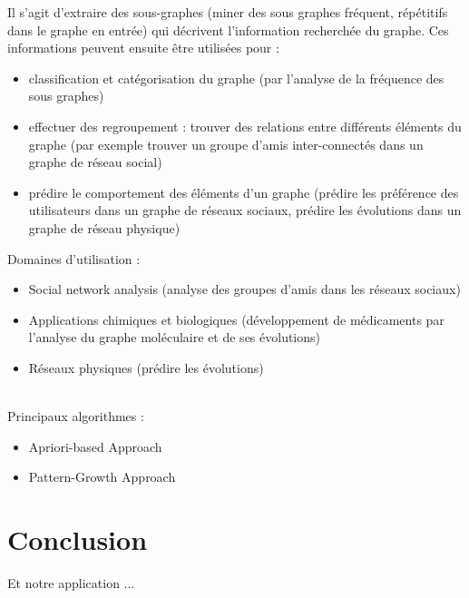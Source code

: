 	\begin{frame}
		Il s'agit d'extraire des sous-graphes (miner des sous graphes fréquent, répétitifs dans le graphe en entrée) qui décrivent l'information recherchée du graphe. Ces informations peuvent ensuite être utilisées pour :
		\begin{itemize}
			\pause\item classification et catégorisation du graphe (par l'analyse de la fréquence des sous graphes)
			\pause\item effectuer des regroupement : trouver des relations entre différents éléments du graphe (par exemple trouver un groupe d'amis inter-connectés dans un graphe de réseau social)
			\pause\item prédire le comportement des éléments d'un graphe (prédire les préférence des utilisateurs dans un graphe de réseaux sociaux, prédire les évolutions dans un graphe de réseau physique)
		\end{itemize}
	\end{frame}
	\begin{frame}
		Domaines d'utilisation :
		\begin{itemize}
			\pause \item Social network analysis (analyse des groupes d'amis dans les réseaux sociaux)
			\pause \item Applications chimiques et biologiques (développement de médicaments par l'analyse du graphe moléculaire et de ses évolutions)
			\pause \item Réseaux physiques (prédire les évolutions)
		\end{itemize}
		~\\
		\pause
		Principaux algorithmes :
		\begin{itemize}
			\pause \item Apriori-based Approach
			\pause \item Pattern-Growth Approach
		\end{itemize}
	\end{frame}
	
	\section{Conclusion}
	\begin{frame}
		Et notre application ...
	\end{frame}


